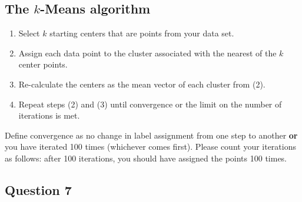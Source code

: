 \documentclass{article}
\begin{document}
\subsection{The $k$-Means algorithm}

\begin{enumerate}
\item Select $k$ starting centers that are points from your data set. 
\item Assign each data point to the cluster associated with the nearest of the $k$ center points.
\item Re-calculate the centers as the mean vector of each cluster from (2).
\item Repeat steps (2) and (3) until convergence or the limit on the number of iterations is met.
\end{enumerate}

Define convergence as no change in label assignment from one step to another \textbf{or} you have iterated 100 times (whichever comes first). Please count your iterations as follows: after 100 iterations, you should have assigned the points 100 times. 


\subsection{Question 7}
\end{document}
